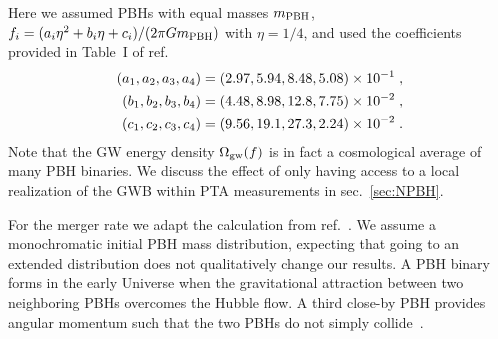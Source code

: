 Here we assumed \acp{PBH}   with equal masses $m_{\mathrm{PBH}}$, $f_i = (a_i \eta^2 + b_i \eta + c_i) / (2 \pi G m_{\mathrm{PBH}})$ with $\eta = 1/4$, and used the coefficients provided in Table~I of ref.~\cite{Ajith:2007kx}
\begin{subequations}
	\begin{align}
		(a_1, a_2, a_3, a_4) &= (2.97, 5.94 , 8.48, 5.08) \times 10^{-1}  \;, \\
		(b_1, b_2, b_3, b_4) &= (4.48, 8.98, 12.8, 7.75) \times 10^{-2}  \;, \\
		(c_1, c_2, c_3, c_4) &= (9.56, 19.1, 27.3, 2.24) \times 10^{-2}\;. 
	\end{align}
\end{subequations}
Note that the \ac{GW} energy density $\Omega_{\text{gw}}(f)$ is in fact a cosmological average of many \ac{PBH} binaries. We discuss the effect of only having access to a local realization of the \ac{GWB} within \ac{PTA} measurements in sec.~\ref{sec:NPBH}.

For the merger rate we adapt the calculation from ref.~\cite{Raidal:2017mfl}. We assume a monochromatic initial \ac{PBH} mass distribution, expecting that going to an extended distribution does not qualitatively change our results. A \ac{PBH} binary forms in the early Universe when the gravitational attraction between two neighboring \acp{PBH} overcomes the Hubble flow. A third close-by \ac{PBH} provides angular momentum such that the two \acp{PBH} do not simply collide~\cite{Nakamura:1997sm,Ioka:1998nz,Sasaki:2016jop}.

